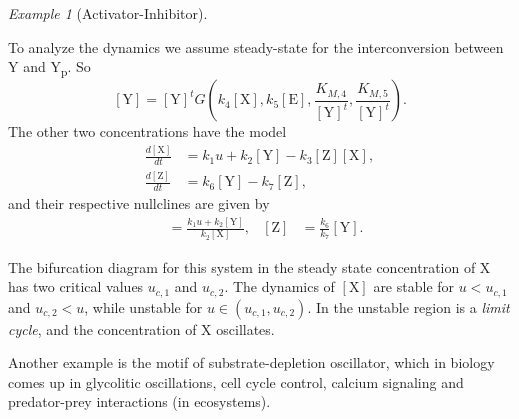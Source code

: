 \documentclass[a4paper]{article}
\newcommand{\co}[1]{[\text{#1}]} %
\theoremstyle{plain}
\theoremstyle{definition}
\theoremstyle{remark}
\newtheorem*{example}{Example}
\begin{document}
\begin{example}[Activator-Inhibitor]
\begin{center}
  \end{center}
  To analyze the dynamics we assume steady-state for the interconversion
  between Y and Y\textsubscript{p}. So
  \[
    \co{Y} = \co{Y}^t G\left(
      k_4 \co{X}, k_5 \co{E}, \frac{K_{M,4}}{\co{Y}^t}, \frac{K_{M,5}}{\co{Y}^t}
    \right).
  \]
  The other two concentrations have the model
  \begin{align*}
    \frac{d\co{X}}{dt} &= k_1 u + k_2 \co{Y} - k_3 \co{Z} \co{X}, \\
    \frac{d\co{Z}}{dt} &= k_6 \co{Y} - k_7 \co{Z},
  \end{align*}
  and their respective nullclines are given by
  \begin{align*}
    \co{Z} &= \frac{k_1 u + k_2 \co{Y}}{k_2 \co{X}}, &
    \co{Z} &= \frac{k_6}{k_7} \co{Y}.
  \end{align*}

  The bifurcation diagram for this system in the steady state concentration of
  X has two critical values $u_{c,1}$ and $u_{c,2}$. The dynamics of $\co{X}$
  are stable for $u < u_{c,1}$ and $u_{c,2} < u$, while unstable for $u \in
  (u_{c,1}, u_{c,2})$. In the unstable region is a \emph{limit cycle}, and the
  concentration of X oscillates.
\end{example}

Another example is the motif of substrate-depletion oscillator, which in
biology comes up in glycolitic oscillations, cell cycle control, calcium
signaling and predator-prey interactions (in ecosystems).
\end{document}
